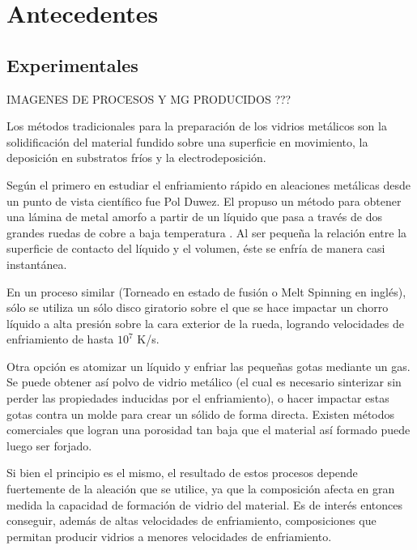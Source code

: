 
\section{Antecedentes}
\label{S1_2}


\subsection{Experimentales}
\label{S1_2_1}

IMAGENES DE PROCESOS Y MG PRODUCIDOS ??? 

Los métodos tradicionales para la preparación de los vidrios metálicos son la solidificación del material fundido sobre una superficie en movimiento, la deposición en substratos fríos y la electrodeposición.

Según \cite{liebermann93} el primero en estudiar el enfriamiento rápido en aleaciones metálicas desde un punto de vista científico fue Pol Duwez. El propuso un método para obtener una lámina de metal amorfo a partir de un líquido que pasa a través de dos grandes ruedas de cobre a baja temperatura \citep{duwez60}. Al ser pequeña la relación entre la superficie de contacto del líquido y el volumen, éste se enfría de manera casi instantánea.

En un proceso similar (Torneado en estado de fusión o Melt Spinning en inglés), sólo se utiliza un sólo disco giratorio sobre el que se hace impactar un chorro líquido a alta presión sobre la cara exterior de la rueda, logrando velocidades de enfriamiento de hasta $10^{7}$ K/s.

Otra opción es atomizar un líquido y enfriar las pequeñas gotas mediante un gas. Se puede obtener así polvo de vidrio metálico (el cual es necesario sinterizar sin perder las propiedades inducidas por el enfriamiento), o hacer impactar estas gotas contra un molde para crear un sólido de forma directa. Existen métodos comerciales que logran una porosidad tan baja que el material así formado puede luego ser forjado.

Si bien el principio es el mismo, el resultado de estos procesos depende fuertemente de la aleación que se utilice, ya que la composición afecta en gran medida la capacidad de formación de vidrio del material. Es de interés entonces conseguir, además de altas velocidades de enfriamiento, composiciones que permitan producir vidrios a menores velocidades de enfriamiento.

